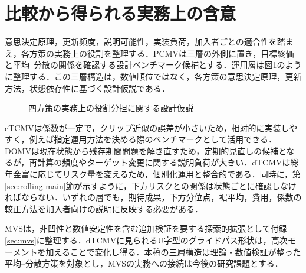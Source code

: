 \documentclass[10pt,a4paper]{article}
\theoremstyle{plain}
\theoremstyle{definition}
\begin{document}
\section{比較から得られる実務上の含意}\label{sec:implementation}
意思決定原理，更新頻度，説明可能性，実装負荷，加入者ごとの適合性を踏まえ，各方策の実務上の役割を整理する．PCMVは三層の外側に置き，目標終価と平均--分散の関係を確認する設計ベンチマーク候補とする．運用層は図\ref{fig:three-layer}のように整理する．この三層構造は，数値順位ではなく，各方策の意思決定原理，更新方法，状態依存性に基づく設計仮説である．

\begin{figure}[htbp]
\centering
{}
\caption{四方策の実務上の役割分担に関する設計仮説}
\label{fig:three-layer}
\end{figure}

cTCMVは係数が一定で，クリップ近似の誤差が小さいため，相対的に実装しやすく，例えば指定運用方法を決める際のベンチマークとして活用できる．DOMVは現在状態から残存期間問題を解き直すため，定期的見直しの候補となるが，再計算の頻度やターゲット変更に関する説明負荷が大きい．dTCMVは総年金富に応じてリスク量を変えるため，個別化運用と整合的である．同時に，第\ref{sec:rolling-main}節が示すように，下方リスクとの関係は状態ごとに確認しなければならない．いずれの層でも，期待成果，下方分位点，裾平均，費用，係数の較正方法を加入者向けの説明に反映する必要がある．

MVSは，非凹性と数値安定性を含む追加検証を要する探索的拡張として付録\ref{sec:mvs}に整理する．dTCMVに見られるU字型のグライドパス形状は，高次モーメントを加えることで変化し得る．本稿の三層構造は理論・数値検証が整った平均--分散方策を対象とし，MVSの実務への接続は今後の研究課題とする．
\end{document}
